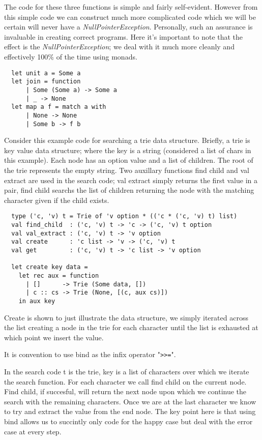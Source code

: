 \documentclass[a4paper,10pt]{article}
\theoremstyle{definition}
\begin{document}
The code for these three functions is simple and fairly self-evident.
However from this simple code we can construct much more complicated code which we
will be certain will never have a \textit{NullPointerException}.
Personally, such an assurance is invaluable in creating correct programs.
Here it's important to note that the effect is the \textit{NullPointerException};
we deal with it much more cleanly and effectively 100\% of the time using monads.

\begin{verbatim}
  let unit a = Some a
  let join = function
      | Some (Some a) -> Some a
      | _ -> None
  let map a f = match a with
      | None -> None
      | Some b -> f b
\end{verbatim}

Consider this example code for searching a trie data structure. Briefly,
a trie is key value data structure; where the key is a string (considered a
list of chars in this example). Each node has an option value and a list of
children. The root of the trie represents the empty string. Two auxillary
functions find child and val extract are used in the search code;
val extract simply returns the first value in a pair, find child searchs
the list of children returning the node with the matching character given
if the child exists.

\begin{verbatim}
  type ('c, 'v) t = Trie of 'v option * (('c * ('c, 'v) t) list)
  val find_child  : ('c, 'v) t -> 'c -> ('c, 'v) t option
  val val_extract : ('c, 'v) t -> 'v option
  val create      : 'c list -> 'v -> ('c, 'v) t
  val get         : ('c, 'v) t -> 'c list -> 'v option

  let create key data =
    let rec aux = function
      | []      -> Trie (Some data, [])
      | c :: cs -> Trie (None, [(c, aux cs)])
    in aux key
\end{verbatim}

Create is shown to just illustrate the data structure,
we simply iterated across the list creating a node in the trie for each character
until the list is exhausted at which point we insert the value.

It is convention to use bind as the infix operator "\texttt{>>=}".

In the search code t is the trie, key is a list of characters over which
we iterate the search function. For each character we call find child on
the current node. Find child, if succesful, will return the next node
upon which we continue the search with the remaining characters. Once we
are at the last character we know to try and extract the value from the end
node. The key point here is that using bind allows us to succintly only code
for the happy case but deal with the error case at every step.
\end{document}
